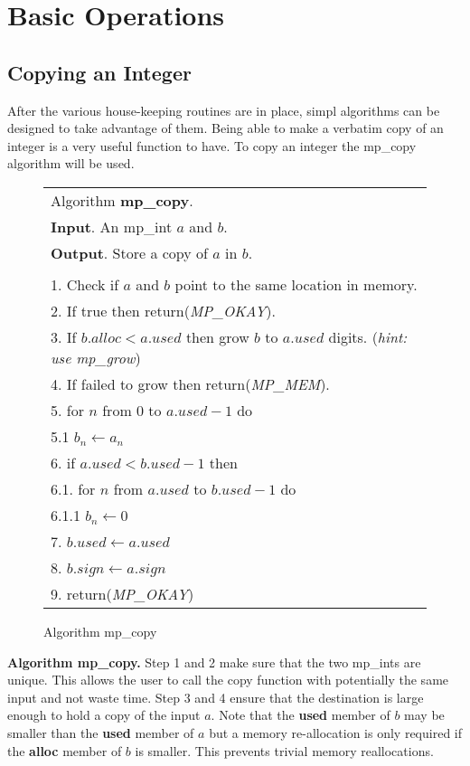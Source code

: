 \documentclass[b5paper]{book}
\begin{document}
\chapter{Basic Operations}
\section{Copying an Integer}
After the various house-keeping routines are in place, simpl algorithms can be designed to take advantage of them.  Being able
to make a verbatim copy of an integer is a very useful function to have.  To copy an integer the mp\_copy algorithm will be used.

\newpage\begin{figure}[here]
\begin{center}
\begin{tabular}{l}
\hline Algorithm \textbf{mp\_copy}. \\
\textbf{Input}.  An mp\_int $a$ and $b$. \\
\textbf{Output}.  Store a copy of $a$ in $b$. \\
\hline \\
1.  Check if $a$ and $b$ point to the same location in memory. \\
2.  If true then return(\textit{MP\_OKAY}). \\
3.  If $b.alloc < a.used$ then grow $b$ to $a.used$ digits.  (\textit{hint: use mp\_grow}) \\
4.  If failed to grow then return(\textit{MP\_MEM}). \\
5.  for $n$ from 0 to $a.used - 1$ do \\
\hspace{3mm}5.1  $b_{n} \leftarrow a_{n}$ \\
6.  if $a.used < b.used - 1$ then \\ 
\hspace{3mm}6.1.  for $n$ from $a.used$ to $b.used - 1$ do \\
\hspace{6mm}6.1.1  $b_{n} \leftarrow 0$ \\
7.  $b.used \leftarrow a.used$ \\
8.  $b.sign \leftarrow a.sign$ \\
9.  return(\textit{MP\_OKAY}) \\
\hline
\end{tabular}
\end{center}
\caption{Algorithm mp\_copy}
\end{figure}

\textbf{Algorithm mp\_copy.}
Step 1 and 2 make sure that the two mp\_ints are unique.  This allows the user to call the copy function with
potentially the same input and not waste time.  Step 3 and 4 ensure that the destination is large enough to
hold a copy of the input $a$.  Note that the \textbf{used} member of $b$ may be smaller than the \textbf{used}
member of $a$ but a memory re-allocation is only required if the \textbf{alloc} member of $b$ is smaller.  This
prevents trivial memory reallocations.
\end{document}
